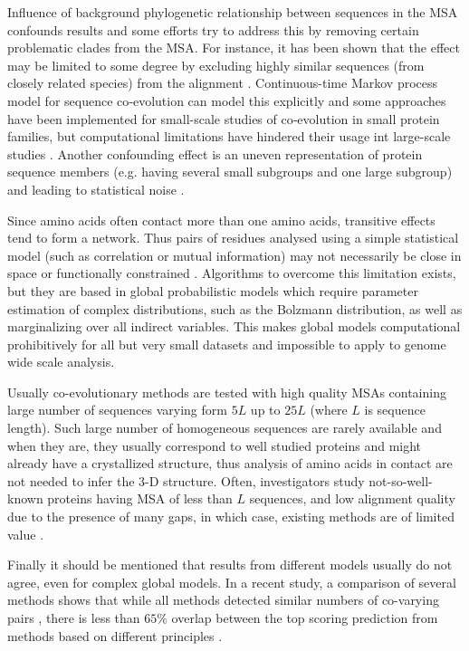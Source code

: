 Influence of background phylogenetic relationship between sequences in the MSA confounds results and some efforts try to address this by 
removing certain problematic clades from the MSA.
For instance, it has been shown that the effect may be limited to some degree by excluding highly similar sequences (from closely related species) from the alignment \cite{wollenberg2000separation}.
Continuous-time Markov process model for sequence co‐evolution can model this explicitly and some approaches have been implemented for small-scale studies of co‐evolution in small protein families, but computational limitations have hindered their usage int large-scale studies \cite{de2013emerging}.
Another confounding effect is an uneven representation of protein sequence members (e.g. having several small subgroups and one large subgroup) and leading to statistical noise \cite{marks2012protein}.

Since amino acids often contact more than one amino acids, transitive effects tend to form a network.
Thus pairs of residues analysed using a simple statistical model (such as correlation or mutual information) may not necessarily be close in space or functionally constrained \cite{marks2012protein}.
Algorithms to overcome this limitation exists, but they are based in global probabilistic models which require parameter estimation of complex distributions, such as the Bolzmann distribution, as well as marginalizing over all indirect variables.
This makes global models computational prohibitively for all but very small datasets and impossible to apply to genome wide scale analysis.

Usually co-evolutionary methods are tested with high quality MSAs containing large number of sequences varying form $5L$ up to $25L$ (where $L$ is  sequence length).
Such large number of homogeneous sequences are rarely available and when they are, they usually correspond to well studied proteins and might already have a crystallized structure, thus analysis of amino acids in contact are not needed to infer the 3-D structure.
Often, investigators study not-so-well-known proteins having MSA of less than $L$ sequences, and low alignment quality due to the presence of many gaps, in which case, existing methods are of limited value \cite{clark2014multidimensional}.

Finally it should be mentioned that results from different models usually do not agree, even for complex global models.
In a recent study, a comparison of several methods shows that while all methods detected similar numbers of co-varying pairs 
, there is less than $65\%$ overlap between the top scoring prediction from methods based on different principles \cite{clark2014multidimensional}.
